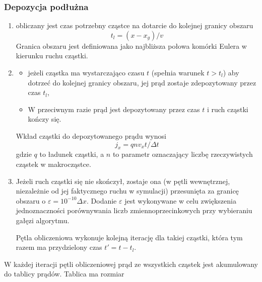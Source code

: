 \subsubsection{Depozycja podłużna} %
\begin{enumerate}
    \item obliczany jest czas potrzebny cząstce na dotarcie do kolejnej
    granicy obszaru
    \begin{equation}
        t_l = (x - x_g)/v
    \end{equation}
    Granica obszaru jest definiowana jako najbliższa połowa komórki Eulera w kierunku
    ruchu cząstki.
    \item
    \begin{itemize}
        \item jeżeli cząstka ma wystarczająco czasu $t$ (spełnia warunek $t > t_l$) aby
        dotrzeć do kolejnej granicy obszaru, jej prąd zostaje zdepozytowany przez czas $t_l$,
        \item W przeciwnym razie prąd jest depozytowany przez czas $t$ i ruch cząstki kończy się.
    \end{itemize}
    Wkład cząstki do depozytowanego prądu wynosi
    \begin{equation}
        j_x = q n v_x t/\Delta t
    \end{equation}
    gdzie $q$ to ładunek cząstki, a $n$ to parametr  oznaczający liczbę
    rzeczywistych cząstek w makrocząstce.

    \item Jeżeli ruch cząstki się nie skończył, zostaje ona (w pętli
    wewnętrznej, niezależnie od jej faktycznego ruchu w symulacji)
     przesunięta za granicę obszaru o $\varepsilon =
    10^{-10} \Delta x$. Dodanie $\varepsilon$ jest wykonywane w celu zwiększenia
    jednoznaczności porównywania liczb zmiennoprzecinkowych przy wybieraniu
    gałęzi algorytmu.

    Pętla obliczeniowa wykonuje kolejną iterację dla takiej cząstki, która tym razem
    ma przydzielony czas $t' = t - t_l$.

\end{enumerate}

W każdej iteracji pętli obliczeniowej prąd ze wszystkich cząstek jest
akumulowany do tablicy prądów. Tablica ma rozmiar  

